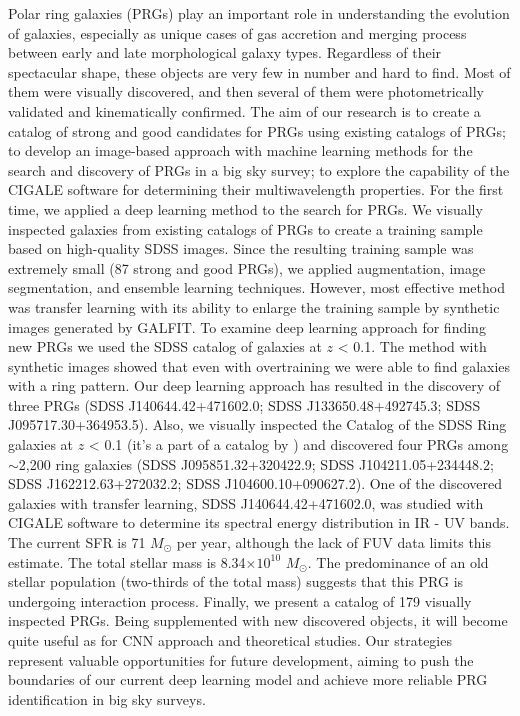 \documentclass{aa}
\begin{document}
   \date{Received April 5, 2025; accepted }
  \abstract
   {Polar ring galaxies (PRGs) play an important role in understanding the evolution of galaxies, especially as unique cases of gas accretion and merging process between early and late morphological galaxy types. Regardless of their spectacular shape, these objects are very few in number and hard to find. Most of them were visually discovered, and then several of them were photometrically validated and kinematically confirmed.
   }
   {The aim of our research is to create a catalog of strong and good candidates for PRGs using existing catalogs of PRGs; to develop an image-based approach with machine learning methods for the search and discovery of PRGs in a big sky survey; to explore the capability of the CIGALE software for determining their multiwavelength properties.   
   }
  {For the first time, we applied a deep learning method to the search for PRGs. We visually inspected galaxies from existing catalogs of PRGs to create a training sample based on high-quality SDSS images. Since the resulting training sample was extremely small (87 strong and good PRGs), we applied augmentation, image segmentation, and ensemble learning techniques. However, most effective method was transfer learning with its ability to enlarge the training sample by synthetic images generated by GALFIT. To examine deep learning approach for finding new PRGs we used the SDSS catalog of galaxies at $z$ < 0.1. The method with synthetic images showed that even with overtraining we were able to find galaxies with a ring pattern.  
  }
   {Our deep learning approach has resulted in the discovery of three PRGs (SDSS J140644.42+471602.0; SDSS J133650.48+492745.3; SDSS J095717.30+364953.5).   
   Also, we visually inspected the Catalog of the SDSS Ring galaxies at $z$ < 0.1 (it's a part of a catalog by \cite{Vavilova2023}) and discovered four PRGs among $\sim$2,200 ring galaxies (SDSS J095851.32+320422.9; SDSS J104211.05+234448.2; SDSS J162212.63+272032.2; SDSS J104600.10+090627.2). 
   One of the discovered galaxies with transfer learning, SDSS J140644.42+471602.0, was studied with CIGALE software to determine its spectral energy distribution in IR - UV bands. The current SFR is 71 $M_{\odot}$ per year, although the lack of FUV data limits this estimate. The total stellar mass is 8.34$\times 10^{10}$ $M_{\odot}$. The predominance of an old stellar population (two-thirds of the total mass) suggests that this PRG is undergoing interaction process.
   Finally, we present a catalog of 179 visually inspected PRGs. Being supplemented with new discovered objects, it will become quite useful as for CNN approach and theoretical studies. Our strategies represent valuable opportunities for future development, aiming to push the boundaries of our current deep learning model and achieve more reliable PRG identification in big sky surveys.   
   }
\end{document}
